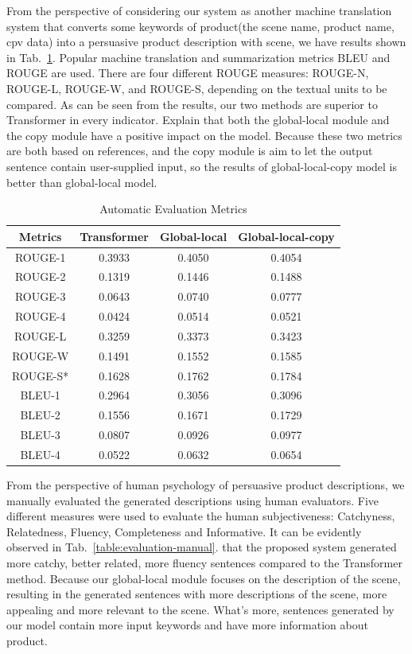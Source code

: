 \documentclass[sigconf]{acmart}
\begin{document}
From the perspective of considering our system as another machine translation system that converts some keywords of product(the scene name, product name, cpv data) into a persuasive product description with scene, we have results shown in Tab.~\ref{table:evaluation-automatic}. Popular machine translation and summarization metrics BLEU and ROUGE are used. There are four different ROUGE measures: ROUGE-N, ROUGE-L, ROUGE-W, and ROUGE-S, depending on the textual units to be compared. As can be seen from the results, our two methods are superior to Transformer in every indicator. Explain that both the global-local module and the copy module have a positive impact on the model. Because these two metrics are both based on references, and the copy module is aim to let the output sentence contain user-supplied input, so the results of global-local-copy model is better than global-local model.

\begin{table}
  \caption{Automatic Evaluation Metrics}
  \label{table:evaluation-automatic}
  \begin{tabular}{c c c c}
    \toprule
    Metrics & Transformer & Global-local & Global-local-copy\\
    \midrule
    ROUGE-1 & 0.3933 & 0.4050 & 0.4054\\
    ROUGE-2 & 0.1319 & 0.1446 & 0.1488\\
    ROUGE-3 & 0.0643 & 0.0740 & 0.0777\\
    ROUGE-4 & 0.0424 & 0.0514 & 0.0521\\
    ROUGE-L & 0.3259 & 0.3373 & 0.3423\\
    ROUGE-W & 0.1491 & 0.1552 & 0.1585\\
    ROUGE-S* & 0.1628 & 0.1762 & 0.1784\\
    BLEU-1 & 0.2964 & 0.3056 & 0.3096\\
    BLEU-2 & 0.1556 & 0.1671 & 0.1729\\
    BLEU-3 & 0.0807 & 0.0926 & 0.0977\\
    BLEU-4 & 0.0522 & 0.0632 & 0.0654\\
  \bottomrule
\end{tabular}
\end{table}

From the perspective of human psychology of persuasive product descriptions, we manually evaluated the generated descriptions using human evaluators. Five different measures were used to evaluate the human subjectiveness: Catchyness, Relatedness, Fluency, Completeness and Informative. It can be evidently observed in Tab.~\ref{table:evaluation-manual}. that the proposed system generated more catchy, better related, more fluency sentences compared to the Transformer method. Because our global-local module focuses on the description of the scene, resulting in the generated sentences with more descriptions of the scene, more appealing and more relevant to the scene. What's more, sentences generated by our model contain more input keywords and have more information about product.
\end{document}
